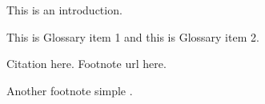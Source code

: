 
This is an introduction.

This is \gls{Glossary item 1} and this is \gls{Glossary item 2}.

Citation here\cite{Li2019}. Footnote url here.

Another footnote simple .

